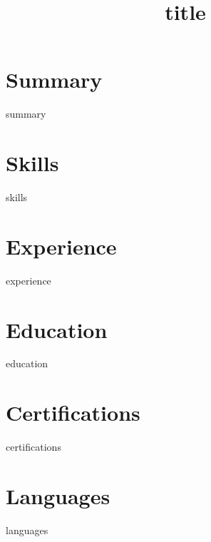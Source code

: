 \documentclass[11pt,a4paper,sans]{moderncv}
\title{{{title}}}
\begin{document}
\makecvtitle

\section{Summary}
{{summary}}

\section{Skills}
{{skills}}

\section{Experience}
{{experience}}

\section{Education}
{{education}}

\section{Certifications}
{{certifications}}

\section{Languages}
{{languages}}
\end{document}
